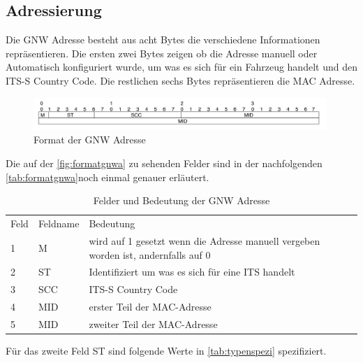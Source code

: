 \subsection{Adressierung} 
Die \acl{GNW} Adresse besteht aus acht Bytes die verschiedene Informationen repräsentieren. Die ersten zwei Bytes zeigen ob die Adresse manuell oder Automatisch konfiguriert wurde, um was es sich für ein Fahrzeug handelt und den ITS-S Country Code. Die restlichen sechs Bytes repräsentieren die MAC Adresse.\cite{etsi302636-4-1}
\begin{figure}
\includegraphics[width=0.99\textwidth]{content/images/03_networklayer/gnwadress.jpg}
\caption{Format der \acl{GNW} Adresse}
\label{fig:formatgnwa}
\end{figure}
Die auf der \autoref{fig:formatgnwa} zu sehenden Felder sind in der nachfolgenden \autoref{tab:formatgnwa}noch einmal genauer erläutert.

\begin{table}[h]
\begin{tabular}{lll}
Feld & Feldname & Bedeutung \\
    1 & M       & wird auf 1 gesetzt wenn die Adresse manuell vergeben worden ist, andernfalls auf 0          \\
    2 & ST    & Identifiziert um was es sich für eine ITS handelt       \\
    3 & SCC   &   ITS-S Country Code        \\
    4 & MID    &    erster Teil der MAC-Adresse       \\
    5 & MID     &   zweiter Teil der MAC-Adresse        \\
\end{tabular}
\caption{Felder und Bedeutung der \acs{GNW} Adresse\cite{etsi302636-4-1}}
\label{tab:formatgnwa}
\end{table}

Für das zweite Feld ST sind folgende Werte in \autoref{tab:typenspezi} spezifiziert.

